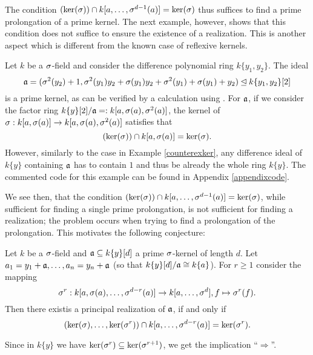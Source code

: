 The condition $(\operatorname{ker}(\sigma)) \cap k[a,\ldots,\sigma^{d-1}(a)] = \operatorname{ker}(\sigma)$ thus suffices to find a prime prolongation of a prime kernel. 
The next example, however, shows that this condition does not suffice to ensure the existence of a realization. This is another aspect which is different from the known case of reflexive kernels.


\begin{ex}\label{secondexamplem2}
Let $k$ be a $\sigma$-field and consider the difference polynomial ring $k\{y_1,y_2\}$. 
The ideal $$\mathfrak{a} = (\sigma^2(y_2)+1,\sigma^2(y_1)y_2 + \sigma(y_1)y_2 + \sigma^2(y_1) + \sigma(y_1) + y_2) \unlhd k\{y_1,y_2\}[2]$$ is a prime kernel,
as can be verified by a calculation using \cite{M2}. For $\mathfrak{a}$, if we consider the factor ring 
$k\{y\}[2]/\mathfrak{a} =: k[a,\sigma(a),\sigma^2(a)]$, the kernel of \\ $\sigma: k[a,\sigma(a)] \rightarrow k[a,\sigma(a),\sigma^2(a)]$
satisfies that $$(\operatorname{ker}(\sigma)) \cap k[a,\sigma(a)] = \operatorname{ker}(\sigma).$$ However, similarly to the case in Example \ref{counterexker}, any difference ideal of $k\{y\}$ containing 
$\mathfrak{a}$ has to contain $1$ and thus be already the whole ring $k\{y\}$. The commented code for this example can be found in Appendix \ref{appendixcode}.
\end{ex}

We see then, that the condition $(\operatorname{ker}(\sigma)) \cap k[a,\ldots,\sigma^{d-1}(a)] = \operatorname{ker}(\sigma)$, while sufficient for finding a single prime prolongation,
is not sufficient for finding a realization; the problem occurs when trying to find a prolongation of the prolongation. This motivates the following conjecture:

\begin{conj}
Let $k$ be a $\sigma$-field and $\mathfrak{a} \subseteq k\{y\}[d]$ a prime $\sigma$-kernel of length $d$.
Let $a_1 = y_1 + \mathfrak{a} ,\ldots,a_n = y_n + \mathfrak{a}$ (so that $k\{y\}[d]/\mathfrak{a} \cong k\{a\}$).
For $r \geq 1$ consider the mapping 
\[ \sigma^r : k[a,\sigma(a),\ldots,\sigma^{d-r}(a)] \rightarrow k[a,\ldots,\sigma^{d}], f \mapsto \sigma^r(f). \]
Then there existis a principal realization of $\mathfrak{a}$, if and only if 
\begin{equation*} (\operatorname{ker}(\sigma),\ldots,\operatorname{ker}(\sigma^r)) \cap k[a,\ldots,\sigma^{d-r}(a)] = \operatorname{ker}(\sigma^r). \end{equation*}
\end{conj}

Since in $k\{y\}$ we have $\operatorname{ker}(\sigma^r) \subseteq \operatorname{ker}(\sigma^{r+1})$, we get the implication ``$\Rightarrow$''. 




